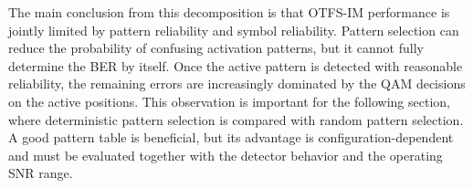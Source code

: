 The main conclusion from this decomposition is that OTFS-IM performance is jointly limited by pattern reliability and symbol reliability. Pattern selection can reduce the probability of confusing activation patterns, but it cannot fully determine the BER by itself. Once the active pattern is detected with reasonable reliability, the remaining errors are increasingly dominated by the QAM decisions on the active positions. This observation is important for the following section, where deterministic pattern selection is compared with random pattern selection. A good pattern table is beneficial, but its advantage is configuration-dependent and must be evaluated together with the detector behavior and the operating SNR range.
